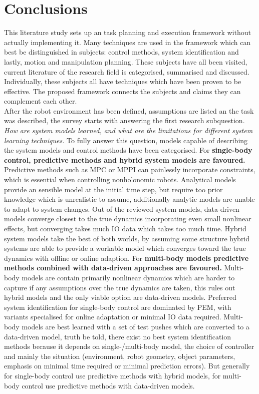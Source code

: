 \chapter{Conclusions}
\label{chapter: conclusion}
This literature study sets up an task planning and execution framework without actually implementing it. Many techniques are used in the framework which can best be distinguished in subjects: control methods, system identification and lastly, motion and manipulation planning. These subjects have all been visited, current literature of the research field is categorised, summarised and discussed. Individually, these subjects all have techniques which have been proven to be effective. The proposed framework connects the subjects and claims they can complement each other. \\

After the robot environment has been defined, assumptions are listed an the task was described, the survey starts with answering the first research subquestion.\\

\textit{How are system models learned, and what are the limitations for different system learning techniques.} To fully answer this question, models capable of describing the system models and control methods have been categorised. For \textbf{single-body control, predictive methods and hybrid system models are favoured.} Predictive methods such as \ac{MPC} or \ac{MPPI} can painlessly incorporate constraints, which is essential when controlling nonholonomic robots. Analytical models provide an sensible model at the initial time step, but require too prior knowledge which is unrealistic to assume, additionally analytic models are unable to adapt to system changes. Out of the reviewed system models, data-driven models converge closest to the true dynamics incorporating even small nonlinear effects, but converging takes much \ac{IO} data which takes too much time. Hybrid system models take the best of both worlds, by assuming some structure hybrid systems are able to provide a workable model which converges toward the true dynamics with offline or online adaption. For \textbf{multi-body models predictive methods combined with data-driven approaches are favoured.} Multi-body models are contain primarily nonlinear dynamics which are harder to capture if any assumptions over the true dynamics are taken, this rules out hybrid models and the only viable option are data-driven models. Preferred system identification for single-body control are dominated by \ac{PEM}, with variants specialised for online adaptation or minimal \ac{IO} data required. Multi-body models are best learned with a set of test pushes which are converted to a data-driven model, truth be told, there exist no best system identification methods because it depends on single-/multi-body model, the choice of controller and mainly the situation (environment, robot geometry, object parameters, emphasis on minimal time required or minimal prediction errors). But generally for single-body control use predictive methods with hybrid models, for multi-body control use predictive methods with data-driven models. \\

